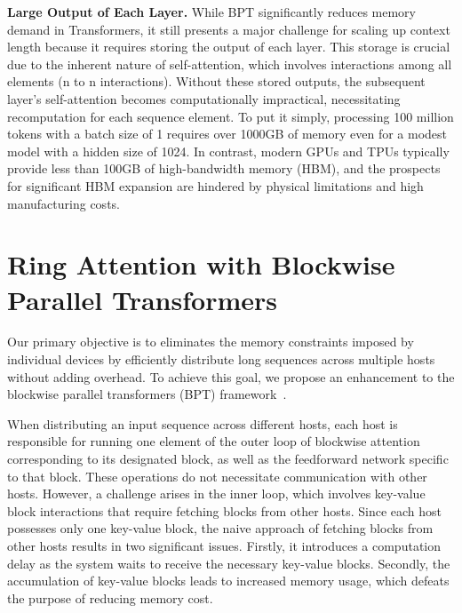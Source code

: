 \textbf{Large Output of Each Layer.} While BPT significantly reduces memory demand in Transformers, it still presents a major challenge for scaling up context length because it requires storing the output of each layer. This storage is crucial due to the inherent nature of self-attention, which involves interactions among all elements (n to n interactions). Without these stored outputs, the subsequent layer's self-attention becomes computationally impractical, necessitating recomputation for each sequence element. To put it simply, processing 100 million tokens with a batch size of 1 requires over 1000GB of memory even for a modest model with a hidden size of 1024. In contrast, modern GPUs and TPUs typically provide less than 100GB of high-bandwidth memory (HBM), and the prospects for significant HBM expansion are hindered by physical limitations and high manufacturing costs.

\section{Ring Attention with Blockwise Parallel Transformers} Our primary objective is to eliminates the memory constraints imposed by individual devices by efficiently distribute long sequences across multiple hosts without adding overhead. To achieve this goal, we propose an enhancement to the blockwise parallel transformers (BPT) framework~\citep{liu2023blockwise}.

When distributing an input sequence across different hosts, each host is responsible for running one element of the outer loop of blockwise attention corresponding to its designated block, as well as the feedforward network specific to that block. These operations do not necessitate communication with other hosts. However, a challenge arises in the inner loop, which involves key-value block interactions that require fetching blocks from other hosts. Since each host possesses only one key-value block, the naive approach of fetching blocks from other hosts results in two significant issues. Firstly, it introduces a computation delay as the system waits to receive the necessary key-value blocks. Secondly, the accumulation of key-value blocks leads to increased memory usage, which defeats the purpose of reducing memory cost.

